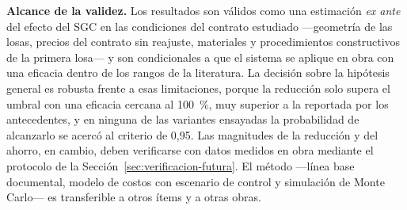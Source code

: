 \textbf{Alcance de la validez.} Los resultados son válidos como una estimación \emph{ex ante} del efecto del SGC en las condiciones del contrato estudiado ---geometría de las losas, precios del contrato sin reajuste, materiales y procedimientos constructivos de la primera losa--- y son condicionales a que el sistema se aplique en obra con una eficacia dentro de los rangos de la literatura. La decisión sobre la hipótesis general es robusta frente a esas limitaciones, porque la reducción solo supera el umbral con una eficacia cercana al 100~\%, muy superior a la reportada por los antecedentes, y en ninguna de las variantes ensayadas la probabilidad de alcanzarlo se acercó al criterio de 0,95. Las magnitudes de la reducción y del ahorro, en cambio, deben verificarse con datos medidos en obra mediante el protocolo de la Sección~\ref{sec:verificacion-futura}. El método ---línea base documental, modelo de costos con escenario de control y simulación de Monte Carlo--- es transferible a otros ítems y a otras obras.
